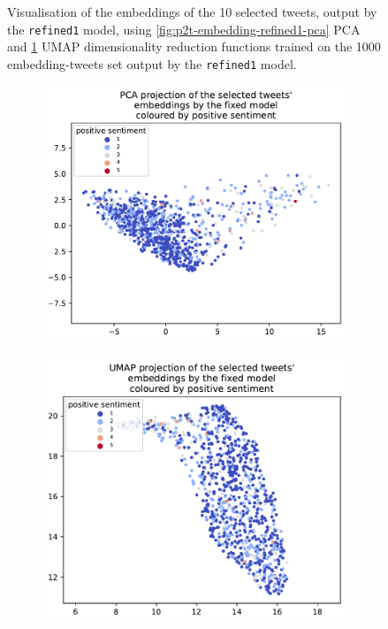 \begin{figure}
\begin{subfigure}[t]{\textwidth}
        \caption{}\label{fig:p2t-embedding-refined1-umap}
    \end{subfigure}
    \caption{Visualisation of the embeddings of the 10 selected tweets, output by the \texttt{refined1} model, using \cref{fig:p2t-embedding-refined1-pca} PCA and \cref{fig:p2t-embedding-refined1-umap} UMAP dimensionality reduction functions trained on the 1000 embedding-tweets set output by the \texttt{refined1} model.}
    \label{fig:p2t-embedding-refined1}
\end{figure}

\begin{figure}
    \centering
    \begin{subfigure}{0.49\textwidth}
        \includegraphics[width=\textwidth]{images/transformer_embedding_many_fixed_pca_positive.pdf}
        \caption{}\label{fig:p2t-embeddings-many-fixed-pca}
    \end{subfigure}
    \hfill
    \begin{subfigure}{0.49\textwidth}
        \includegraphics[width=\textwidth]{images/transformer_embedding_many_fixed_umap_positive.pdf}

\end{subfigure}
\end{figure}
